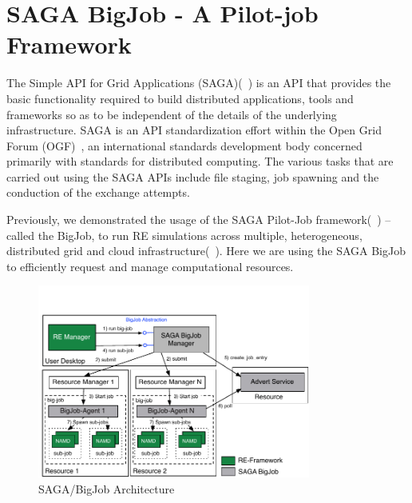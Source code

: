 \documentclass{rspublic}
\newcommand{\alnote}[1]{ {\textcolor{blue} { ***andre: #1 }}}
\newcommand{\athotanote}[1]{ {\textcolor{green} { ***athota: #1 }}}
\newcommand{\alnote}[1]{}
\newcommand{\athotanote}[1]{}
\begin{document}



\section{SAGA BigJob - A Pilot-job Framework}
\label{sec:BigJob}

The Simple API for Grid Applications (SAGA)(~\citep{saga_gfd90}) is an API that provides the basic functionality required to build distributed applications, tools and frameworks so as to be independent of the details of the underlying infrastructure. SAGA is an API standardization effort within the Open Grid Forum (OGF)~\citep{ogf_web}, an international standards development body concerned primarily with standards for distributed computing. The various tasks that are carried out using the SAGA APIs include file staging, job spawning and the conduction of the exchange attempts.

Previously, we demonstrated the usage of the SAGA Pilot-Job framework(~\citep{saga_bigjob_condor_cloud}) -- called the BigJob, to run RE simulations across multiple, heterogeneous, distributed grid and cloud infrastructure(~\citep{Luckow:2008fp}). Here we are using the SAGA BigJob to efficiently request and manage computational resources. 

\begin{figure}[t]
      \centering
          \includegraphics[width=0.8\textwidth]{Bigjob_arch.pdf}
          \caption{\footnotesize SAGA/BigJob Architecture
              }
      \label{fig:bigjob}
\end{figure}
\end{document}
